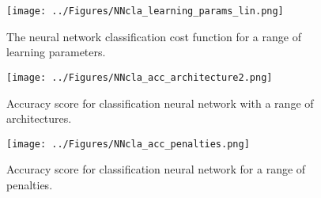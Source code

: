 \documentclass[notitlepage, reprint, nofootinbib]{revtex4-1}
\begin{document}
\begin{figure}
	\centering 
	\texttt{[image: ../Figures/NNcla\_learning\_params\_lin.png]}
	\caption{The neural network classification cost function for a range of learning parameters.}
	\label{fig15}
\end{figure}

\begin{figure}
	\centering 
	\texttt{[image: ../Figures/NNcla\_acc\_architecture2.png]}
	\caption{Accuracy score for classification neural network with a range of architectures. }
	\label{fig16}
\end{figure}

\begin{figure}
	\centering 
	\texttt{[image: ../Figures/NNcla\_acc\_penalties.png]}
	\caption{Accuracy score for classification neural network for a range of penalties.}
	\label{fig17}
\end{figure}
\end{document}
